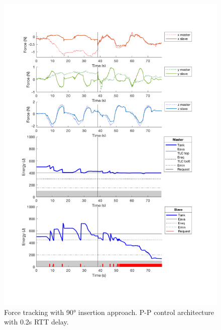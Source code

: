 \begin{center}
	\begin{figure}
		\includegraphics[width=\textwidth, keepaspectratio]{plots/pp90Delay/Force.pdf}
		\caption{Force tracking with 90° insertion approach. P-P control architecture with 0.2s RTT delay.}
		\label{graph:pp90Delay/Force}
	\end{figure}
\end{center}
\newpage
